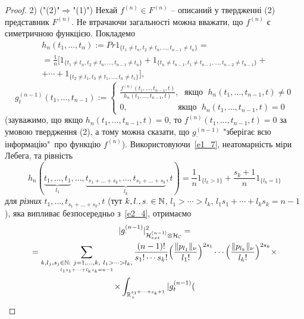 \begin{proof}
2) ("(2)"$\Rightarrow$"(1)") Нехай $f^{(n)}\in F^{(n)}$ -- описаний у твердженні (2)
представник $F^{(n)}$. Не втрачаючи загальності можна вважати, що $f^{(n)}$ є симетричною
функцією. Покладемо
\begin{equation}\label{e2_4}
\begin{gathered}
h_n(t_1,\dots,t_n)
:=Pr 1_{\{t_1\not=t_n,t_2\not=t_n,\dots,t_{n-1}\not=t_n\}}=\\
=\frac{1}{n}
\big[1_{\{t_1\not=t_n,t_2\not=t_n,\dots,t_{n-1}\not=t_n\}}
+1_{\{t_n\not=t_{n-1},t_1\not=t_{n-1},\dots,t_{n-2}\not=t_{n-1}\}}+\\
+\cdots+1_{\{t_2\not=t_1,t_3\not=t_1,\dots,t_n\not=t_1\}}\big],
\end{gathered}
\end{equation}
\begin{equation}\label{e2_5}
g^{(n-1)}_t(t_1,\dots,t_{n-1}):=
\begin{cases}
\frac{f^{(n)}(t_1,\dots,t_{n-1},t)}{h_n(t_1,\dots,t_{n-1},t)},
{\operatorname{\ \text{якщо}\ }} h_n(t_1,\dots,t_{n-1},t)\not=0
\\
0,\ \ \qquad\qquad\quad
{\operatorname{\ \text{якщо}\ }} h_n(t_1,\dots,t_{n-1},t)=0
\end{cases}
\end{equation}
(зауважимо, що якщо $h_n(t_1,\dots,t_{n-1},t)=0$, то $f^{(n)}(t_1,\dots,t_{n-1},t)=0$ за
умовою твердження (2), а тому можна сказати, що $g^{(n-1)}_\cdot$ "зберігає всю інформацію"\ про
функцію $f^{(n)}$). Використовуючи~\eqref{e1_7}, неатомарність міри Лебега, та рівність
\begin{equation}\label{e2_6}
h_n(\underset{l_1}{\underbrace{t_1,\dots,t_1}},\dots,
\underset{l_k}{\underbrace{t_{s_1+\dots+s_k},\dots,t_{s_1+\dots+s_k}}},t)
=\frac{1}{n}1_{\{l_k>1\}}+\frac{s_k+1}{n}1_{\{l_k=1\}}
\end{equation}
для {\it різних} $t_1,\dots,t_{s_1+\dots+s_k},t$ (тут $k,l_\cdot,s_\cdot\in\mathbb{N}$,
$l_1>\cdots>l_k$, $l_1s_1+\cdots+l_ks_k=n-1$), яка випливає безпосередньо з~\eqref{e2_4},
отримаємо
\begin{equation}\label{e2_7}
\begin{gathered}
|g^{(n-1)}_\cdot|_{\Hcal_{ext}^{(n-1)}\otimes\Hcal_{\bC}}^2=\\
=\sum_{\underset{l_1s_1+\cdots+l_ks_k=n-1}{k,l_j,s_j\in\bN:
\ j=1,\dots,k,\ l_1>\cdots>l_k,}}
\frac{(n-1)!}{s_1!\cdots s_k!}\Big(\frac{\|p_{l_1}\|_\nu}{l_1!}\Big)^{2s_1}
\cdots\Big(\frac{\|p_{l_k}\|_\nu}{l_k!}\Big)^{2s_k}\times\\
\times\int_{\bR_+^{s_1+\cdots+s_k+1}}|g^{(n-1)}_t(

\end{gathered}
\end{equation}
\end{proof}
